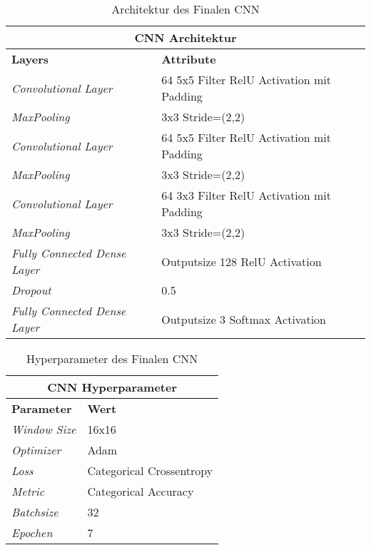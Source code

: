 {
	\renewcommand{\arraystretch}{1.3}
	
	\begin{table}[H]
		\scriptsize
		\centering
		\begin{tabularx}{.8\textwidth}{XX}\\
			\multicolumn{2}{c}{\textbf{CNN Architektur}}\\
			\hline
			\textbf{Layers} & \textbf{Attribute}\\
			\hline
			\textit{Convolutional Layer} & 64 5x5 Filter RelU Activation mit Padding\\
			\hline
			\textit{MaxPooling} & 3x3 Stride=(2,2)\\
			\hline 
			\textit{Convolutional Layer} & 64 5x5 Filter RelU Activation mit Padding\\
			\hline
			\textit{MaxPooling} & 3x3 Stride=(2,2)\\
			\hline
			\textit{Convolutional Layer} & 64 3x3 Filter RelU Activation mit Padding\\
			\hline
			\textit{MaxPooling} & 3x3 Stride=(2,2)\\
			\hline
			\textit{Fully Connected Dense Layer} & Outputsize 128 RelU Activation\\
			\hline
			\textit{Dropout} & 0.5\\
			\hline
			\textit{Fully Connected Dense Layer} & Outputsize 3 Softmax Activation\\
			\hline
		\end{tabularx}
		\caption{Architektur des Finalen CNN}
		\label{tbl:cnnArchitecture}
	\end{table}
	\begin{table}[H]
		\scriptsize
		\centering
		\begin{tabularx}{.8\textwidth}{XX}
			\multicolumn{2}{c}{\textbf{CNN Hyperparameter}}\\
			\hline
			\textbf{Parameter} &  \textbf{Wert}\\
			\hline
			\textit{Window Size} & 16x16\\
			\hline
			\textit{Optimizer} & Adam\\
			\hline  
			\textit{Loss} & Categorical Crossentropy\\
			\hline
			\textit{Metric} & Categorical Accuracy\\
			\hline
			\textit{Batchsize} & 32\\
			\hline
			\textit{Epochen} & 7\\
			\hline
		\end{tabularx}
		\caption{Hyperparameter des Finalen CNN}
		\label{tbl:hyperparameter}
	\end{table}
}


